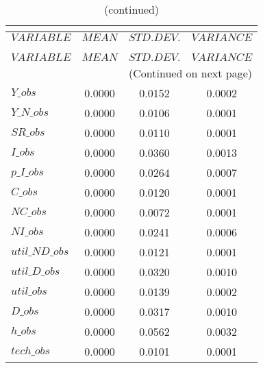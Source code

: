  
\begin{center}
\begin{longtable}{lccc} 
\caption{THEORETICAL MOMENTS}\\
 \label{Table:th_moments}\\
\toprule 
$VARIABLE       $	 & 	 $         MEAN$	 & 	 $    STD. DEV.$	 & 	 $     VARIANCE$\\
\midrule \endfirsthead 
\caption{(continued)}\\
 \toprule \\ 
$VARIABLE       $	 & 	 $         MEAN$	 & 	 $    STD. DEV.$	 & 	 $     VARIANCE$\\
\midrule \endhead 
\midrule \multicolumn{4}{r}{(Continued on next page)} \\ \bottomrule \endfoot 
\bottomrule \endlastfoot 
$Y\_obs         $	 & 	       0.0000	 & 	       0.0152	 & 	       0.0002 \\ 
$Y\_N\_obs      $	 & 	       0.0000	 & 	       0.0106	 & 	       0.0001 \\ 
$SR\_obs        $	 & 	       0.0000	 & 	       0.0110	 & 	       0.0001 \\ 
$I\_obs         $	 & 	       0.0000	 & 	       0.0360	 & 	       0.0013 \\ 
$p\_I\_obs      $	 & 	       0.0000	 & 	       0.0264	 & 	       0.0007 \\ 
$C\_obs         $	 & 	       0.0000	 & 	       0.0120	 & 	       0.0001 \\ 
$NC\_obs        $	 & 	       0.0000	 & 	       0.0072	 & 	       0.0001 \\ 
$NI\_obs        $	 & 	       0.0000	 & 	       0.0241	 & 	       0.0006 \\ 
$util\_ND\_obs  $	 & 	       0.0000	 & 	       0.0121	 & 	       0.0001 \\ 
$util\_D\_obs   $	 & 	       0.0000	 & 	       0.0320	 & 	       0.0010 \\ 
$util\_obs      $	 & 	       0.0000	 & 	       0.0139	 & 	       0.0002 \\ 
$D\_obs         $	 & 	       0.0000	 & 	       0.0317	 & 	       0.0010 \\ 
$h\_obs         $	 & 	       0.0000	 & 	       0.0562	 & 	       0.0032 \\ 
$tech\_obs      $	 & 	       0.0000	 & 	       0.0101	 & 	       0.0001 \\ 
\end{longtable}
 \end{center}
